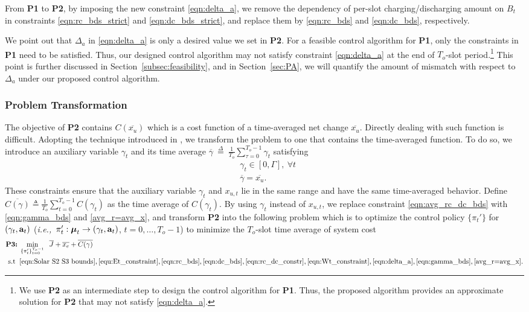 \documentclass[journal]{IEEEtran}
\def\mubf{\boldsymbol \mu }
\def\abf{{\bf a}}
\def\defeq{~{\stackrel{\Delta}{=}}~}
\def\ie{{\it i.e.,\ \/}}
\def\nn{\nonumber}
\begin{document}
From {\bf P1} to {\bf P2}, by imposing the new constraint \eqref{eqn:delta_a}, we remove the dependency of per-slot charging/discharging amount on $B_t$ in constraints \eqref{eqn:rc_bds_strict} and \eqref{eqn:dc_bds_strict}, and replace them by \eqref{eqn:rc_bds} and \eqref{eqn:dc_bds},  respectively.

We point out that $\Delta_a$ in \eqref{eqn:delta_a} is  only a desired value we set in {\bf P2}. For a feasible control algorithm for  {\bf P1}, only the constraints in {\bf P1} need to be satisfied. Thus, our designed control algorithm may not satisfy  constraint \eqref{eqn:delta_a}  at the end of $T_o$-slot period.\footnote{We use {\bf P2} as an intermediate step to design the control algorithm for {\bf P1}. Thus, the proposed algorithm provides an approximate solution for {\bf P2} that may not satisfy \eqref{eqn:delta_a}.} This point is further discussed in Section~\ref{subsec:feasibility}, and in Section~\ref{sec:PA}, we will quantify the amount of mismatch with respect to $\Delta_a$ under our proposed control algorithm.

\subsubsection{Problem Transformation}
The objective of {\bf P2} contains   $C(\overline{x_u})$ which is a cost function of a time-averaged net change $\overline{x_u}$. Directly dealing with such function is difficult. Adopting the technique introduced in \cite{Neely:ArXiv2010}, we transform the problem to one that contains the time-averaged  function. To do so, we introduce an auxiliary variable $\gamma_t$ and its time average  $\overline{\gamma}\defeq \frac{1}{T_o}\sum_{\tau=0}^{T_o-1}\gamma_t$ satisfying
\begin{align}
&\gamma_t \in [0, \Gamma], \ \forall t\label{eqn:gamma_bds}\\
&\overline{\gamma}=\overline{x_u}. \label{avg_r=avg_x}
\end{align}
These constraints ensure that the auxiliary variable $\gamma_t$ and $x_{u,t}$ lie in the same range and have the same time-averaged behavior. Define $\overline{C(\gamma)}\triangleq \frac{1}{T_o}\sum_{t=0}^{T_o-1}C(\gamma_t)$
as the time average of $C(\gamma_t)$.  By using $\gamma_t$ instead of $x_{u,t}$, we replace constraint \eqref{eqn:avg_rc_dc_bds} with \eqref{eqn:gamma_bds} and \eqref{avg_r=avg_x}, and transform  {\bf P2} into the following  problem which is to optimize the control policy $\{\pi_t'\}$ for $(\gamma_t,\abf_t)$ (\ie $\pi_t':\mubf_t\rightarrow (\gamma_t,\abf_t)$, $t=0,\ldots,T_o-1$) to minimize the $T_o$-slot time average of system cost
\begin{align}
\textrm{\bf P3:}\; &\min_{\{\pi_t'\}_{t=0}^{T_o-1}} \;\;
\overline{J}+\overline{x_e}+\overline{C(\gamma)}\nn\\
\rm{s.t} \;\;
&\eqref{eqn:Solar S2 S3 bounds},\eqref{equ:Et_constraint},\eqref{eqn:rc_bds}, \eqref{eqn:dc_bds}, \eqref{eqn:rc_dc_constr},\eqref{eqn:Wt_constraint},\eqref{eqn:delta_a},\eqref{eqn:gamma_bds},\eqref{avg_r=avg_x}. \nonumber
\end{align}
\end{document}
